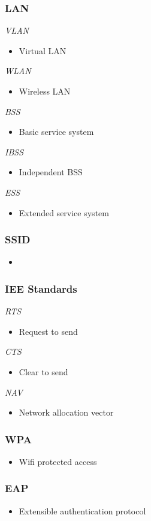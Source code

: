 \documentclass[10pt,xcolor=pdflatex,hyperref={unicode}]{beamer}
\begin{document}
    \begin{frame}
        \frametitle{LAN}
        \emph{VLAN}
        \begin{itemize}
            \item Virtual LAN
        \end{itemize}
        \emph{WLAN}
        \begin{itemize}
            \item Wireless LAN
        \end{itemize}
        \emph{BSS}
        \begin{itemize}
            \item Basic service system
        \end{itemize}
        \emph{IBSS}
        \begin{itemize}
            \item Independent BSS
        \end{itemize}
        \emph{ESS}
        \begin{itemize}
            \item Extended service system
        \end{itemize}
    \end{frame}

    \begin{frame}
        \frametitle{SSID}
        \begin{itemize}
            \item
        \end{itemize}
    \end{frame}

    \begin{frame}
        \frametitle{IEE Standards}
        \emph{RTS}
        \begin{itemize}
            \item Request to send
        \end{itemize}
        \emph{CTS}
        \begin{itemize}
            \item Clear to send
        \end{itemize}
        \emph{NAV}
        \begin{itemize}
            \item Network allocation vector
        \end{itemize}
    \end{frame}

    \begin{frame}
        \frametitle{WPA}
        \begin{itemize}
            \item Wifi protected access
        \end{itemize}
    \end{frame}

    \begin{frame}
        \frametitle{EAP}
        \begin{itemize}
            \item Extensible authentication protocol
        \end{itemize}
    \end{frame}
\end{document}
